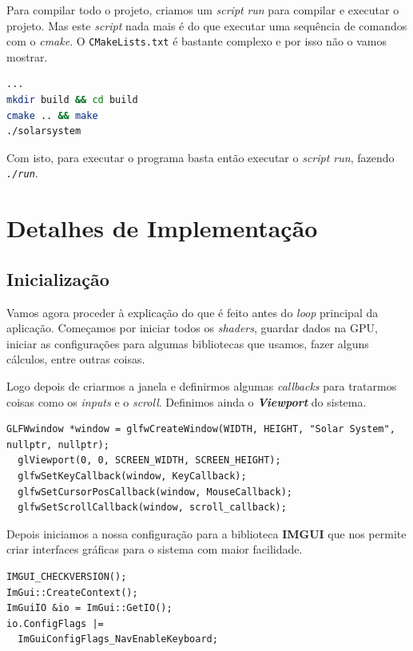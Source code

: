 \noindent
Para compilar todo o projeto, criamos um \textit{script} \textit{run} para compilar e executar o projeto. Mas este \textit{script} nada mais é do que executar uma sequência de comandos com o \textit{cmake}. O \texttt{CMakeLists.txt} é bastante complexo e por isso não o vamos mostrar.

\begin{lstlisting}[language=Bash, caption=\textit{Script Run}]
...
mkdir build && cd build
cmake .. && make
./solarsystem
\end{lstlisting}

\noindent
Com isto, para executar o programa basta então executar o \textit{script run}, fazendo \texttt{\textit{./run}}.

\section{Detalhes de Implementação}
\label{chap2:sec:impl}

\subsection{Inicialização}

\noindent
Vamos agora proceder à explicação do que é feito antes do \textit{loop} principal da aplicação. Começamos por iniciar todos os \textit{shaders}, guardar dados na \ac{GPU}, iniciar as configurações para algumas bibliotecas que usamos, fazer alguns cálculos, entre outras coisas.

\noindent
Logo depois de criarmos a janela e definirmos algumas \textit{callbacks} para tratarmos coisas como os \textit{inputs} e o \textit{scroll}. Definimos ainda o \textbf{\textit{Viewport}} do sistema.

\begin{lstlisting}[style=Cpp, caption=Inicialização da Janela]
  GLFWwindow *window = glfwCreateWindow(WIDTH, HEIGHT, "Solar System", nullptr, nullptr);
  glViewport(0, 0, SCREEN_WIDTH, SCREEN_HEIGHT);
  glfwSetKeyCallback(window, KeyCallback);
  glfwSetCursorPosCallback(window, MouseCallback);
  glfwSetScrollCallback(window, scroll_callback);
\end{lstlisting}

\noindent
Depois iniciamos a nossa configuração para a biblioteca \textbf{\ac{IMGUI}} que nos permite criar interfaces gráficas para o sistema com maior facilidade.

\begin{lstlisting}[style=Cpp, caption=Inicialização do \textit{IMGUI}]
IMGUI_CHECKVERSION();
ImGui::CreateContext();
ImGuiIO &io = ImGui::GetIO();
io.ConfigFlags |=
  ImGuiConfigFlags_NavEnableKeyboard;
\end{lstlisting}

